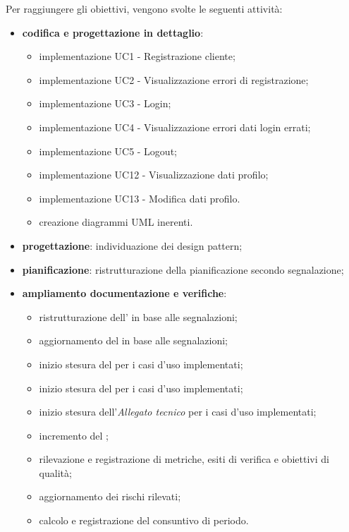 Per raggiungere gli obiettivi, vengono svolte le seguenti attività:
\begin{itemize}

\item \textbf{codifica e progettazione in dettaglio}:
\begin{itemize}
\item implementazione UC1 - Registrazione cliente;
\item implementazione UC2 - Visualizzazione errori di registrazione;
\item implementazione UC3 - Login;
\item implementazione UC4 - Visualizzazione errori dati login errati;
\item implementazione UC5 - Logout;
\item implementazione UC12 - Visualizzazione dati profilo;
\item implementazione UC13 - Modifica dati profilo.
\item creazione diagrammi UML inerenti.

\end{itemize}

\item \textbf{progettazione}: individuazione dei design pattern;

\item \textbf{pianificazione}: ristrutturazione della pianificazione secondo segnalazione;

\item \textbf{ampliamento documentazione e verifiche}:
\begin{itemize}
\item ristrutturazione dell' in base alle segnalazioni;
\item aggiornamento del  in base alle segnalazioni;
\item inizio stesura del \MU per i casi d'uso implementati;
\item inizio stesura del \MM per i casi d'uso implementati;
\item inizio stesura dell'\textit{Allegato tecnico} per i casi d'uso implementati;
\item incremento del ;
\item rilevazione e registrazione di metriche, esiti di verifica e obiettivi di qualità;
\item aggiornamento dei rischi rilevati;
\item calcolo e registrazione del consuntivo di periodo.
\end{itemize}

\end{itemize}
